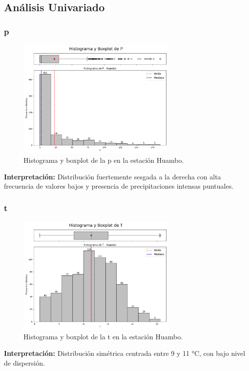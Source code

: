 \subsection{Análisis Univariado}

\subsubsection*{\gls{p} }
\begin{figure}[htbp]
\centering
\includegraphics[width=0.7\textwidth]{resultados/por_estacion_meteorologica/Huambo/P_histograma.png}
\caption{Histograma y boxplot de la \gls{p}  en la estación Huambo.}
\label{fig:huambo_P}
\end{figure}
\textbf{Interpretación:} Distribución fuertemente sesgada a la derecha con alta frecuencia de valores bajos y presencia de precipitaciones intensas puntuales.

\subsubsection*{\gls{t} }
\begin{figure}[htbp]
\centering
\includegraphics[width=0.7\textwidth]{resultados/por_estacion_meteorologica/Huambo/T_histograma.png}
\caption{Histograma y boxplot de la \gls{t}  en la estación Huambo.}
\label{fig:huambo_T}
\end{figure}
\textbf{Interpretación:} Distribución simétrica centrada entre 9 y 11 °C, con bajo nivel de dispersión.

